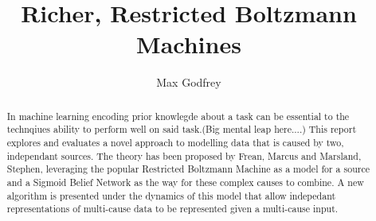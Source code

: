 \documentclass[11pt
              , a4paper
              , twoside
              , openright
              ]{report}
\title{Richer, Restricted Boltzmann Machines}
\author{Max Godfrey}
\date{}
\begin{document}
\frontmatter



\begin{abstract}

In machine learning encoding prior knowlegde about a task can be essential to the technqiues ability to perform well on said task.(Big mental leap here....) This report explores and evaluates a novel approach to modelling data that is caused by two, independant sources. The theory has been proposed by Frean, Marcus and Marsland, Stephen, leveraging the popular Restricted Boltzmann Machine as a model for a source and a Sigmoid Belief Network as the way for these complex causes to combine. A new algorithm is presented under the dynamics of this model that allow indepedant representations of multi-cause data to be represented given a multi-cause input.

\end{abstract}

\maketitle

%


\tableofcontents


\mainmatter






% 

% 
%
% 
%
% 
%
% 

\backmatter



\end{document}
